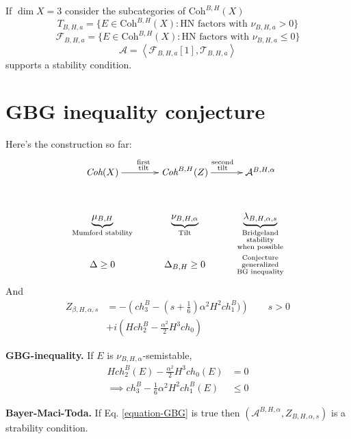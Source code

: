 \medskip\noindent
If $\dim X=3$ consider the subcategories of
$\text{Coh}^{B,H}(X)$
$$
T_{B,H,a}=\{E \in
\text{Coh}^{B,H}(X):\text{HN factors with }
\nu_{B,H,a}>0\}
$$
$$
\mathcal{F}_{B,H,a}=\{E \in
\text{Coh}^{B,H}(X):\text{HN factors with }
\nu_{B,H,a}\leq 0\}
$$
$$
\mathcal{A}=\left\langle{}\mathcal{F}_{B,H,a}[1],
\mathcal{T}_{B,H,a}\right\rangle{}
$$
supports a stability condition.

\section{GBG inequality conjecture}
\label{section-GBG-inequality-conjecture}

Here's the construction so far:
$$
\xymatrix@R=1.4em{
\textit{Coh}(X)\ar[r]^{\substack{\text{first}
\\
\text{tilt}}}
&
\textit{Coh}^{B,H}(Z)\ar[r]
^{\substack{\text{second}
\\ \text{tilt}}}
&  \mathcal{A}^{B,H,\alpha}\\
\underbrace{\mu_{B,H}}_{\text{Mumford
stability}}
&
\underbrace{\nu_{B,H,\alpha}}_{\text{Tilt}}
&  \underbrace{\lambda_{B,H,\alpha,s}}
_{\substack{\text{Bridgeland} \\
\text{stability}\\\text{when possible}}}\\
\Delta \geq 0
&  \Delta_{B,H}\geq 0
&\substack{\text{Conjecture} \\
\text{generalized}\\\text{BG inequality}}
}
$$
And
$$
\begin{aligned}
Z_{\beta,H,\alpha,s}&=-\left(ch^B_3-\left(s+
\frac{1}{6}\right)\alpha^2
H^2ch_1^B)\right)\qquad s>0\\
&+i\left(Hch_2^B-\frac{\alpha^2}{2}
H^3ch_0\right)
\end{aligned}
$$

\medskip\noindent
{\bf GBG-inequality.} If $E$ is
$\nu_{B,H,\alpha}$-semistable,
\begin{equation}
\label{equation-GBG}
\begin{aligned}
H ch_2^B(E)-\frac{\alpha^2}{2}H^3
ch_0(E)&=0\\
\implies
ch_3^{B}-\frac{1}{6}\alpha^2H^2ch_1^B(E)&\leq
0
\end{aligned}
\end{equation}

\medskip\noindent
{\bf Bayer-Maci-Toda.} If Eq.
\ref{equation-GBG} is true then
$(\mathcal{A}^{B,H,\alpha},Z_{B,H,\alpha,s})$
is a strability condition.

